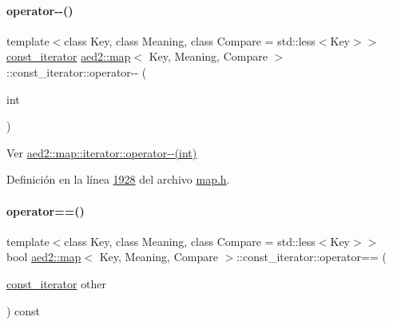 \paragraph{\texorpdfstring{operator-\/-\/()}{operator--()}\hspace{0.1cm}{\footnotesize\ttfamily [2/2]}}
{\footnotesize\ttfamily template$<$class Key, class Meaning, class Compare = std\+::less$<$\+Key$>$$>$ \\
\hyperlink{classaed2_1_1map_1_1const__iterator}{const\+\_\+iterator} \hyperlink{classaed2_1_1map}{aed2\+::map}$<$ Key, Meaning, Compare $>$\+::const\+\_\+iterator\+::operator-\/-\/ (\begin{DoxyParamCaption}\item[{int}]{ }\end{DoxyParamCaption})\hspace{0.3cm}{\ttfamily [inline]}}



Ver \hyperlink{classaed2_1_1map_1_1iterator_add45e9ddbb8eeda99326cdb9ac9dd225_add45e9ddbb8eeda99326cdb9ac9dd225}{aed2\+::map\+::iterator\+::operator-\/-\/(int)} 



Definición en la línea \hyperlink{map_8h_source_l01928}{1928} del archivo \hyperlink{map_8h_source}{map.\+h}.

\mbox{\label{classaed2_1_1map_1_1const__iterator_a2ad68c35012e0c6b67d67c04d96585be_a2ad68c35012e0c6b67d67c04d96585be}} 
\paragraph{\texorpdfstring{operator==()}{operator==()}}
{\footnotesize\ttfamily template$<$class Key, class Meaning, class Compare = std\+::less$<$\+Key$>$$>$ \\
bool \hyperlink{classaed2_1_1map}{aed2\+::map}$<$ Key, Meaning, Compare $>$\+::const\+\_\+iterator\+::operator== (\begin{DoxyParamCaption}\item[{\hyperlink{classaed2_1_1map_1_1const__iterator}{const\+\_\+iterator}}]{other }\end{DoxyParamCaption}) const\hspace{0.3cm}{\ttfamily [inline]}}



